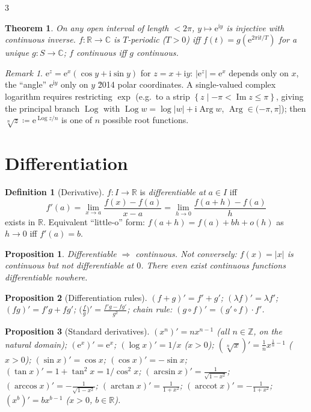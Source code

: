 \documentclass[10pt,a4paper,landscape]{article}
\theoremstyle{definition}
\newtheorem{defn}{Definition}[section]
\theoremstyle{plain}
\newtheorem{thm}{Theorem}[section]
\newtheorem{prop}{Proposition}[section]
\theoremstyle{remark}
\newtheorem{rem}{Remark}[section]
\newcommand{\R}{\mathbb{R}}
\newcommand{\Z}{\mathbb{Z}}
\newcommand{\C}{\mathbb{C}}
\newcommand{\e}{\mathrm{e}}
\newcommand{\im}{\operatorname{Im}}
\newcommand{\abs}[1]{\lvert #1 \rvert}
\newcommand{\set}[1]{\left\{ #1 \right\}}
\newcommand{\deq}{\coloneqq}
\newcommand{\comp}{\circ}
\newcommand{\Logm}{\operatorname{Log}}
\newcommand{\Argm}{\operatorname{Arg}}
\DeclareMathOperator{\arccot}{arccot}
\begin{document}
\begin{multicols*}{3}
\begin{thm}
On any open interval of length $< 2\pi$, $y \mapsto \e^{\mathrm{i} y}$ is injective with continuous inverse. $f: \R \to \C$ is $T$-periodic ($T>0$) iff $f(t) = g(\e^{2\pi \mathrm{i} t / T})$ for a unique $g: S \to \C$; $f$ continuous iff $g$ continuous.
\end{thm}

\begin{rem}
$\e^{z} = \e^{x}(\cos y + \mathrm{i} \sin y)$ for $z = x + \mathrm{i} y$: $\abs{\e^z} = \e^x$ depends only on $x$, the ``angle'' $\e^{\mathrm{i} y}$ only on $y$ \u2014 polar coordinates. A single-valued complex logarithm requires restricting $\exp$ (e.g.\ to a strip $\set{z \mid -\pi < \im z \le \pi}$, giving the principal branch $\Logm$ with $\Logm w = \log\abs{w} + \mathrm{i}\Argm w$, $\Argm \in (-\pi, \pi]$); then $\sqrt[n]{z} \deq \e^{\Logm z / n}$ is one of $n$ possible root functions.
\end{rem}
\section{Differentiation}

\begin{defn}[Derivative]
$f: I \to \R$ is \emph{differentiable at} $a \in I$ iff
\[
f'(a) = \lim_{x \to a} \frac{f(x) - f(a)}{x - a} = \lim_{h \to 0} \frac{f(a+h) - f(a)}{h}
\]
exists in $\R$. Equivalent ``little-o'' form: $f(a+h) = f(a) + b h + o(h)$ as $h \to 0$ iff $f'(a) = b$.
\end{defn}

\begin{prop}
Differentiable $\Rightarrow$ continuous. Not conversely: $f(x) = \abs{x}$ is continuous but not differentiable at $0$. There even exist continuous functions differentiable nowhere.
\end{prop}

\begin{prop}[Differentiation rules]
$(f+g)' = f' + g'$; $(\lambda f)' = \lambda f'$; $(fg)' = f'g + fg'$; $\bigl(\frac{f}{g}\bigr)' = \frac{f'g - fg'}{g^2}$; chain rule: $(g \comp f)' = (g' \comp f) \cdot f'$.
\end{prop}

\begin{prop}[Standard derivatives]
$(x^n)' = n x^{n-1}$ (all $n \in \Z$, on the natural domain); $(\e^x)' = \e^x$; $(\log x)' = 1/x$ ($x>0$); $(\sqrt[n]{x})' = \frac{1}{n} x^{\frac{1}{n}-1}$ ($x>0$); $(\sin x)' = \cos x$; $(\cos x)' = -\sin x$; $(\tan x)' = 1 + \tan^2 x = 1/\cos^2 x$; $(\arcsin x)' = \frac{1}{\sqrt{1-x^2}}$; $(\arccos x)' = -\frac{1}{\sqrt{1-x^2}}$; $(\arctan x)' = \frac{1}{1+x^2}$; $(\arccot x)' = -\frac{1}{1+x^2}$; $(x^b)' = b x^{b-1}$ ($x>0$, $b \in \R$).
\end{prop}


\end{multicols*}
\end{document}
